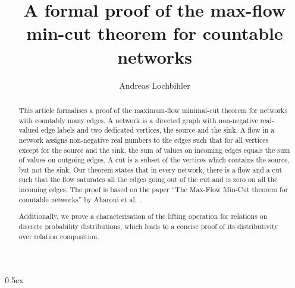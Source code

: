\documentclass[11pt,a4paper]{article}
\begin{document}
\title{A formal proof of the max-flow min-cut theorem for countable networks}
\author{Andreas Lochbihler}
\maketitle

\begin{abstract}
  This article formalises a proof of the maximum-flow minimal-cut theorem for networks with 
  countably many edges.  A network is a directed graph with non-negative real-valued edge labels
  and two dedicated vertices, the source and the sink.  A flow in a network assigns non-negative
  real numbers to the edges such that for all vertices except for the source and the sink, the sum
  of values on incoming edges equals the sum of values on outgoing edges.  A cut is a subset of the
  vertices which contains the source, but not the sink.  Our theorem states that in every network,
  there is a flow and a cut such that the flow saturates all the edges going out of the cut and
  is zero on all the incoming edges.
  The proof is based on the paper ``The Max-Flow Min-Cut theorem for countable networks''
  by Aharoni et al.\ \cite{AharoniBergerGeorgakopoulusPerlsteinSpruessel2011JCT}.

  Additionally, we prove a characterisation of the lifting operation for relations on
  discrete probability distributions, which leads to a concise proof of its distributivity over
  relation composition.
\end{abstract}

\tableofcontents

\parindent 0pt\parskip 0.5ex





\end{document}
